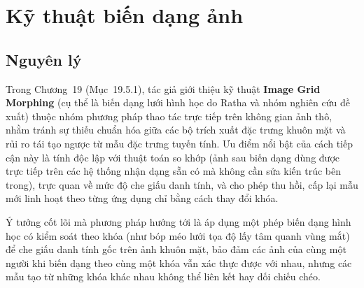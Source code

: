 \section{Kỹ thuật biến dạng ảnh}
\label{sec:ky-thuat-chuong-sach}

\begingroup
\setlength{\abovedisplayskip}{5pt plus 2pt minus 2pt}
\setlength{\belowdisplayskip}{5pt plus 2pt minus 2pt}

\subsection*{Nguyên lý}
Trong Chương~19 (Mục~19.5.1), tác giả giới thiệu kỹ thuật \textbf{Image Grid Morphing} (cụ thể là biến dạng lưới hình học do Ratha và nhóm nghiên cứu đề xuất) thuộc nhóm phương pháp thao tác trực tiếp trên không gian ảnh thô, nhằm tránh sự thiếu chuẩn hóa giữa các bộ trích xuất đặc trưng khuôn mặt và rủi ro tái tạo ngược từ mẫu đặc trưng tuyến tính. Ưu điểm nổi bật của cách tiếp cận này là tính độc lập với thuật toán so khớp (ảnh sau biến dạng dùng được trực tiếp trên các hệ thống nhận dạng sẵn có mà không cần sửa kiến trúc bên trong), trực quan về mức độ che giấu danh tính, và cho phép thu hồi, cấp lại mẫu mới linh hoạt theo từng ứng dụng chỉ bằng cách thay đổi khóa.

Ý tưởng cốt lõi mà phương pháp hướng tới là áp dụng một phép biến dạng hình học có kiểm soát theo khóa (như bóp méo lưới tọa độ lấy tâm quanh vùng mắt) để che giấu danh tính gốc trên ảnh khuôn mặt, bảo đảm các ảnh của cùng một người khi biến dạng theo cùng một khóa vẫn xác thực được với nhau, nhưng các mẫu tạo từ những khóa khác nhau không thể liên kết hay đối chiếu chéo.

